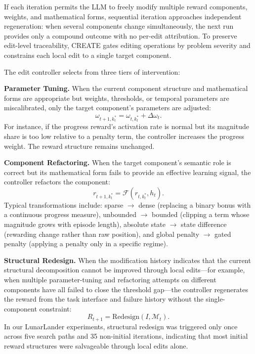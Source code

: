 \documentclass[letterpaper,twocolumn,10pt]{article}
\begin{document}
If each iteration permits the LLM to freely modify multiple reward components, weights, and mathematical forms, sequential iteration approaches independent regeneration: when several components change simultaneously, the next run provides only a compound outcome with no per-edit attribution. To preserve edit-level traceability, CREATE gates editing operations by problem severity and constrains each local edit to a single target component.

The edit controller selects from three tiers of intervention:

\noindent\textbf{Parameter Tuning.} When the current component structure and mathematical forms are appropriate but weights, thresholds, or temporal parameters are miscalibrated, only the target component's parameters are adjusted:
\begin{equation}
\omega_{t+1,k_t^*} = \omega_{t,k_t^*} + \Delta\omega_t.
\label{eq:L1}
\end{equation}
For instance, if the progress reward's activation rate is normal but its magnitude share is too low relative to a penalty term, the controller increases the progress weight. The reward structure remains unchanged.

\noindent\textbf{Component Refactoring.} When the target component's semantic role is correct but its mathematical form fails to provide an effective learning signal, the controller refactors the component:
\begin{equation}
r_{t+1,k_t^*} = \mathcal{F}(r_{t,k_t^*}, h_t).
\label{eq:L2}
\end{equation}
Typical transformations include: sparse $\rightarrow$ dense (replacing a binary bonus with a continuous progress measure), unbounded $\rightarrow$ bounded (clipping a term whose magnitude grows with episode length), absolute state $\rightarrow$ state difference (rewarding change rather than raw position), and global penalty $\rightarrow$ gated penalty (applying a penalty only in a specific regime).

\noindent\textbf{Structural Redesign.} When the modification history indicates that the current structural decomposition cannot be improved through local edits---for example, when multiple parameter-tuning and refactoring attempts on different components have all failed to close the threshold gap---the controller regenerates the reward from the task interface and failure history without the single-component constraint:
\begin{equation}
R_{t+1} = \text{Redesign}(I, \mathcal{M}_t).
\label{eq:L3}
\end{equation}
In our LunarLander experiments, structural redesign was triggered only once across five search paths and 35 non-initial iterations, indicating that most initial reward structures were salvageable through local edits alone.
\end{document}
